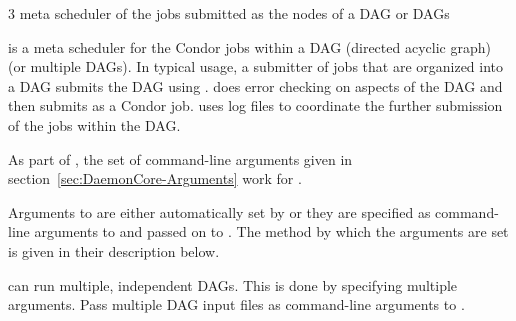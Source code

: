 \begin{ManPage}{\label{man-condor-dagman}}{3}
{meta scheduler of the jobs submitted as the nodes of a DAG or DAGs}
\Synopsis {}


\Description
{} is a meta scheduler for the Condor jobs within
a DAG (directed acyclic graph) (or multiple DAGs).
In typical usage,
a submitter of jobs that are organized into a DAG submits the
DAG using .
 does error checking on aspects of the DAG
and then submits  as a Condor job.
 uses log files to coordinate the further 
submission of the jobs within the DAG.

As part of , the set of command-line arguments
given in
section~\ref{sec:DaemonCore-Arguments}
work for .

Arguments to  are either automatically set
by  
or they are specified as command-line arguments to 
and passed on to .
The method by which the arguments are set is
given in their description below.

 can run multiple, independent DAGs.  This is done
by specifying multiple  arguments.
Pass multiple
DAG input files as command-line arguments to .


\end{ManPage}
